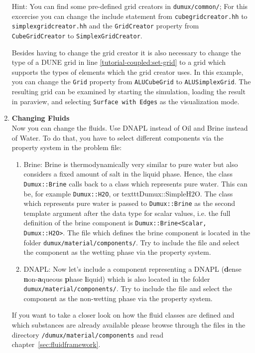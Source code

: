 \begin{enumerate}
  Hint: You can find some pre-defined grid creators in
  \texttt{dumux/common/}; For this excercise you can change the
  include statement from \texttt{cubegridcreator.hh} to
  \texttt{simplexgridcreator.hh} and the \texttt{GridCreator} property
  from \texttt{CubeGridCreator} to \texttt{SimplexGridCreator}.

  Besides having to change the grid creator it is also necessary to
  change the type of a DUNE grid in line
  \ref{tutorial-coupled:set-grid} to a grid which supports the types
  of elements which the grid creator uses. In this example, you can
  change the \texttt{Grid} property from \texttt{ALUCubeGrid} to
  \texttt{ALUSimplexGrid}.  The resulting grid can be examined by
  starting the simulation, loading the result in paraview, and
  selecting \texttt{Surface with Edges} as the visualization mode.

\item \textbf{Changing Fluids} \\
Now you can change the fluids. Use DNAPL instead of Oil and Brine instead of Water. To do that, you have to select different components via the property system in the problem file:
\begin{enumerate}
 \item Brine: Brine is thermodynamically very similar to pure water but also considers a fixed amount of salt in the liquid phase. 
  Hence, the class \texttt{Dumux::Brine} calls back to a class which represents pure water. This can be, for example \texttt{Dumux::H2O}, or texttt{Dumux::SimpleH2O}.
  The class which represents pure water is passed to
  \texttt{Dumux::Brine} as the second template argument after the data
  type for scalar values, i.e. the full definition of the brine
  component is \texttt{Dumux::Brine<Scalar, Dumux::H2O>}. The file
  which defines the brine component is located in the folder
  \texttt{dumux/material/components/}.
  Try to include the file and select the component as the wetting phase via the property system.
 \item DNAPL:  
  Now let's include a component representing a DNAPL (\textbf{d}ense \textbf{n}on-\textbf{a}queous \textbf{p}hase \textbf{l}iquid)
  which is also located in the folder \texttt{dumux/material/components/}. Try to include the file and select the component as the non-wetting phase via the property system.
\end{enumerate}
If you want to take a closer look on how the fluid classes are defined and which substances are already available please browse through the files in the directory
\texttt{/dumux/material/components} and read chapter~\ref{sec:fluidframework}.


\end{enumerate}
